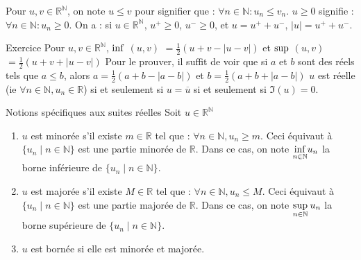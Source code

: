 \documentclass[12pt,a4paper]{report}
\begin{document}
\begin{remarque}
Pour $u,v \in \mathbb{R}^\mathbb{N}$, on note $u \leq v$ pour signifier que : $\forall n \in \mathbb{N} : u_n \leq v_n$.
\newline $u \geq 0$ signifie : $\forall n \in \mathbb{N} : u_n \geq 0$.
\newline On a : si $u \in \mathbb{R}^\mathbb{N}$, $ u^+ \geq 0$, $u^- \geq 0$, et $u = u^+ + u^-$, $\lvert u \rvert = u^+ + u^-$.
\end{remarque}


\begin{application}{Exercice}{}
Pour $u,v \in \mathbb{R}^\mathbb{N}$, $\rm{inf}$ $(u,v)$ $= \frac{1}{2} (u+v - \lvert u-v \rvert)$ et $\rm{sup}$ $(u,v)$ $= \frac{1}{2} (u+v + \lvert u-v \rvert)$
\newline Pour le prouver, il suffit de voir que si $a$ et $b$ sont des réels tels que $a \leq b$, alors \newline $a = \frac{1}{2} (a+b - \lvert a-b \rvert)$ et $b = \frac{1}{2} (a+b + \lvert a-b \rvert)$
\newline $u$ est réelle (ie $\forall n \in \mathbb{N}, u_n \in \mathbb{R}$) si et seulement si $u = \overline{u}$ si et seulement si $\Im(u)=0$.
\end{application}


\begin{definition}{Notions spécifiques aux suites réelles}{}
Soit $u \in \mathbb{R}^\mathbb{N}$
\begin{enumerate}

\item $u$ est minorée s'il existe $m \in \mathbb{R}$ tel que : $\forall n \in \mathbb{N}, u_n \geq m$. \newline Ceci équivaut à $\{u_n \mid n \in \mathbb{N} \}$ est une partie minorée de $\mathbb{R}$. Dans ce cas, on note $\underset{n \in \mathbb{N}}{\rm{inf}} u_n$ la borne inférieure de $\{u_n \mid n \in \mathbb{N} \}$.

\item $u$ est majorée s'il existe $M \in \mathbb{R}$ tel que : $\forall n \in \mathbb{N}, u_n \leq M$. \newline Ceci équivaut à $\{u_n \mid n \in \mathbb{N} \}$ est une partie majorée de $\mathbb{R}$. Dans ce cas, on note $\underset{n \in \mathbb{N}}{\rm{sup }} \: u_n$ la borne supérieure de $\{u_n \mid n \in \mathbb{N} \}$.
\item $u$ est bornée si elle est minorée et majorée.
\end{enumerate}
\end{definition}
\end{document}
